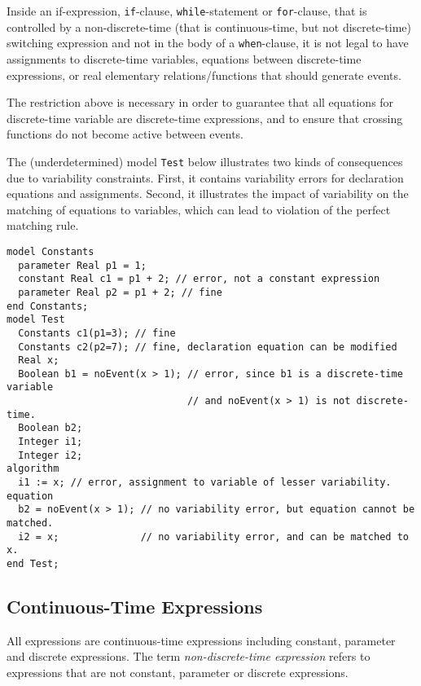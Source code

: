 Inside an if-expression, \lstinline!if!-clause, \lstinline!while!-statement or \lstinline!for!-clause, that
is controlled by a non-discrete-time (that is continuous-time, but not
discrete-time) switching expression and not in the body of a
\lstinline!when!-clause, it is not legal to have assignments to discrete-time variables,
equations between discrete-time expressions, or real elementary
relations/functions that should generate events.

\begin{nonnormative}
The restriction above is necessary in order to guarantee that all equations for discrete-time variable are discrete-time expressions, and to ensure that crossing
functions do not become active between events.
\end{nonnormative}

\begin{example}
The (underdetermined) model \lstinline!Test! below illustrates two kinds of consequences due to variability constraints.
First, it contains variability errors for declaration equations and assignments.
Second, it illustrates the impact of variability on the matching of equations to variables, which can
lead to violation of the perfect matching rule.
\begin{lstlisting}[language=modelica]
model Constants
  parameter Real p1 = 1;
  constant Real c1 = p1 + 2; // error, not a constant expression
  parameter Real p2 = p1 + 2; // fine
end Constants;
model Test
  Constants c1(p1=3); // fine
  Constants c2(p2=7); // fine, declaration equation can be modified
  Real x;
  Boolean b1 = noEvent(x > 1); // error, since b1 is a discrete-time variable
                               // and noEvent(x > 1) is not discrete-time.
  Boolean b2;
  Integer i1;
  Integer i2;
algorithm
  i1 := x; // error, assignment to variable of lesser variability.
equation
  b2 = noEvent(x > 1); // no variability error, but equation cannot be matched.
  i2 = x;              // no variability error, and can be matched to x.
end Test;
\end{lstlisting}
\end{example}

\subsection{Continuous-Time Expressions}\label{continuous-time-expressions}

All expressions are continuous-time expressions including constant,
parameter and discrete expressions. The term \emph{non-discrete-time
expression} refers to expressions that are not constant, parameter or
discrete expressions.
